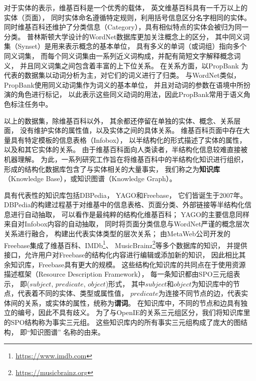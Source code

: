 对于实体的表示，维基百科是一个优秀的载体，
英文维基百科具有一千万以上的实体（页面），
同时实体命名遵循特定规则，利用括号信息区分名字相同的实体。
同时维基百科还维护了分类信息（Category），具有相似特点的实体会被归为同一分类。
普林斯顿大学设计的WordNet\cite{miller1995wordnet}数据库更加关注概念上的区分，
其中同义词集（Synset）是用来表示概念的基本单位，
具有多义的单词（或词组）指向多个同义词集，
而每个同义词集由一系列近义词构成，并配有简短文字解释概念词义，
并且同义词集之间包含着丰富的上下位关系。
在关系方面，以PropBank\cite{kingsbury2002treebank}
为代表的数据集以动词分析为主，对它们的词义进行了归类。
与WordNet类似，PropBank使用同义动词集作为词义的基本单位，
并且对动词的参数在语境中所扮演的角色进行标记，
以此表示这些同义动词的用法，因此PropBank常用于语义角色标注任务中。

以上的数据集，除维基百科以外，
其余都还停留在单独的实体、概念、关系层面，
没有维护实体的属性值，以及实体之间的具体关系。
维基百科页面中存在大量具有特定模板的信息表格（Infobox），
以半结构化的形式描述了实体的属性，以及和其它实体的关系。
由于维基百科面向人类读者，半结构化信息较难直接被机器理解。
为此，一系列研究工作旨在将维基百科中的半结构化知识进行组织，
形成的结构化数据库包含了与实体相关的大量事实，
我们称之为\textbf{知识库}（Knowledge Base），或知识图谱（Knowledge Graph）。

具有代表性的知识库包括DBPedia\cite{auer2007dbpedia}，
YAGO\cite{suchanek2007yago}和Freebase\cite{bollacker2008freebase}，
它们皆诞生于2007年。
DBPedia的构建过程基于对维基中的信息表格、页面分类、外部链接等半结构化信息进行自动抽取，
可以看作是最纯粹的结构化维基百科；
YAGO的主要信息同样来自对Infobox内容的自动抽取，
同时将页面分类信息与WordNet严谨的概念层次关系进行融合，
构建出代表实体类型的层次关系；
由MetaWeb公司开发的Freebase集成了维基百科、IMDb\footnote{\url{https://www.imdb.com}}、
MusicBrainz\footnote{\url{https://musicbrainz.org}}等多个数据库的知识，
并提供接口，允许用户对Freebase的结构化内容进行编辑或添加新的知识，
因此相比其余知识库，Freebase具有更大的规模。
这些结构化知识库的共同点在于使用资源描述框架（Resource Description Framework），
每一条知识都由SPO三元组表示，
即($subject$, $predicate$, $object$)形式，
其中$subject$和$object$为知识库中的节点，代表着不同的实体、类型或属性值，
$predicate$为连接不同节点的边，代表实体间的关系，或实体的属性，统称为\textbf{谓词}。
在知识库中，不同的节点和边具有独立的编号，因此不具有歧义。
为了与OpenIE的关系三元组区分，我们将知识库里的SPO结构称为事实三元组。
这些知识库内的所有事实三元组构成了庞大的图结构，
即``{知识图谱}'' 名称的由来。

